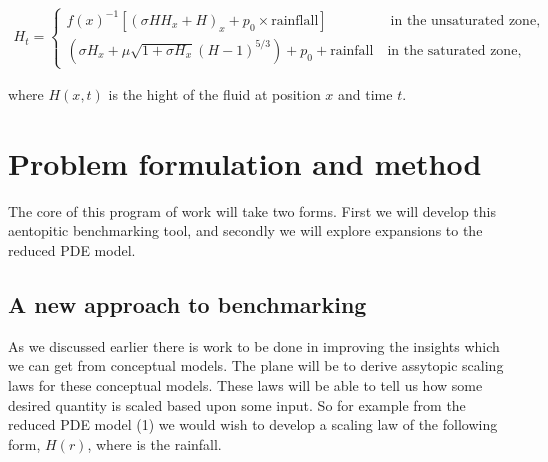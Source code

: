 \documentclass[11pt]{article}
\begin{document}
 \begin{align}
    H_t=\begin{cases}
        f(x)^{-1}[(\sigma HH_x+H)_x+p_0\times\text {rainflall}] \qquad \qquad  \ \; \text{in the unsaturated zone},\\
        (\sigma H_x+\mu\sqrt{1+\sigma H_x}(H-1)^{5/3})+p_0 +\text{rainfall} \quad \text{in the saturated zone},
    \end{cases}
\end{align}

where $H(x,t)$ is the hight of the fluid at position $x$ and time $t$.





\section{Problem formulation and method}
The core of this program of work will take two forms. First we will develop this aentopitic benchmarking tool, and secondly we will explore expansions to the reduced PDE model. 
\subsection{A new approach to benchmarking}
As we discussed earlier there is work to be done in improving the insights which we can get from conceptual models. The plane will be to derive assytopic scaling laws for these conceptual models. These laws will be able to tell us how some desired quantity is scaled based upon some input. So for example from the reduced PDE model (1) we would wish to develop a scaling law of the following form, $H(r)$, where is the rainfall. 
\end{document}
